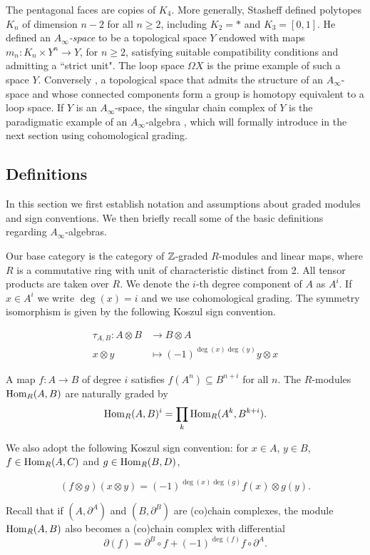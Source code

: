 \documentclass[Thesis.tex]{subfiles}
\begin{document}
The pentagonal faces are copies of $K_4$. More generally, Stasheff \cite{STASHEFFI} defined polytopes $K_n$ of dimension $n−2$ for all $n \geq 2$, including $K_2 = *$ and $K_3 = [0, 1]$. He defined an \emph{$A_\infty$-space} to be a topological space
$Y$ endowed with maps $m_n : K_n × Y^n \to Y$, for $n \geq 2$, satisfying suitable compatibility
conditions and admitting a ``strict unit". The loop space $\Omega X$ is the prime example of
such a space $Y$. Conversely \cite{Adams}, a topological space that admits the structure of
an $A_\infty$-space and whose connected components form a group is homotopy equivalent
to a loop space. If $Y$ is an $A_\infty$-space, the singular chain complex of $Y$ is the paradigmatic example
of an $A_\infty$-algebra \cite{STASHEFF}, which will formally introduce in the next section using cohomological grading.

\subsection{Definitions}

In this section we first establish notation and assumptions about graded modules and sign conventions. We then briefly recall some of the basic definitions regarding $A_\infty$-algebras.

Our base category is the category of $\mathbb{Z}$-graded $R$-modules and linear maps, where $R$ is a commutative ring with unit of characteristic distinct from 2. All tensor products are taken over $R$. We denote the $i$-th degree component of $A$ as $A^i$. If $x\in A^i$ we write $\deg(x)=i$ and we use cohomological grading. The symmetry isomorphism is given by the following Koszul sign convention.

\begin{align*}
\tau_{A,B}:A\otimes B&\to B\otimes A\\
x\otimes y &\mapsto (-1)^{\deg(x)\deg(y)}y\otimes x
\end{align*}

 A map $f:A\to B$ of degree $i$ satisfies $f(A^n)\subseteq B^{n+i}$ for all $n$. The $R$-modules $\operatorname{Hom}_R(A,B)$ are naturally graded by \[\operatorname{Hom}_R(A,B)^i=\prod_k\operatorname{Hom}_R(A^k,B^{k+i}).\]

We also adopt the following Koszul sign convention: for $x\in A$, $y\in B$, $f\in\operatorname{Hom}_R(A,C)$ and $g\in\operatorname{Hom}_R(B,D)$,

\[(f\otimes g)(x\otimes y)=(-1)^{\deg(x)\deg(g)}f(x)\otimes g(y).\]

Recall that if $(A,\partial^A)$ and $(B,\partial^B)$ are (co)chain complexes, the module $\operatorname{Hom}_R(A,B)$ also becomes a (co)chain complex with differential
\[\partial(f) = \partial^B\circ f +(-1)^{\deg(f)}f\circ\partial^A.\]
\end{document}
